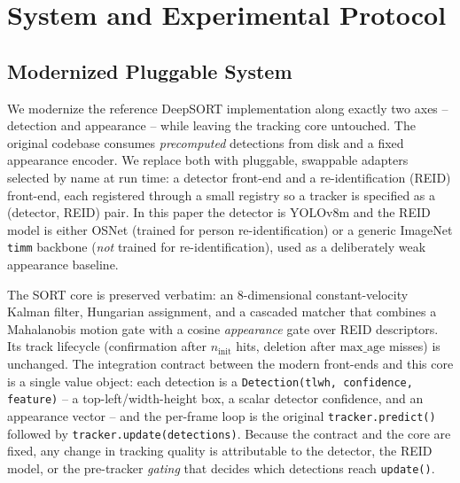 \section{System and Experimental Protocol}
\label{sec:method}

\subsection{Modernized Pluggable System}

We modernize the reference DeepSORT implementation \cite{bewley2016sort,wojke2017deepsort}
along exactly two axes -- detection and appearance -- while leaving the tracking core untouched.
The original codebase consumes \emph{precomputed} detections from disk and a fixed appearance
encoder. We replace both with pluggable, swappable adapters selected by name at run time: a
detector front-end and a re-identification (REID) front-end, each registered through a small
registry so a tracker is specified as a (detector, REID) pair. In this paper the detector is
YOLOv8m \cite{jocher2023yolov8} and the REID model is either OSNet \cite{zhou2019osnet} (trained
for person re-identification) or a generic ImageNet \texttt{timm} backbone \cite{wightman2019timm}
(\emph{not} trained for re-identification), used as a deliberately weak appearance baseline.

The SORT core is preserved verbatim: an 8-dimensional constant-velocity Kalman filter, Hungarian
assignment, and a cascaded matcher that combines a Mahalanobis motion gate with a cosine
\emph{appearance} gate over REID descriptors. Its track lifecycle (confirmation after $n_{\text{init}}$
hits, deletion after $\text{max\_age}$ misses) is unchanged. The integration contract between the
modern front-ends and this core is a single value object: each detection is a
\texttt{Detection(tlwh, confidence, feature)} -- a top-left/width-height box, a scalar detector
confidence, and an appearance vector -- and the per-frame loop is the original
\texttt{tracker.predict()} followed by \texttt{tracker.update(detections)}. Because the contract and
the core are fixed, any change in tracking quality is attributable to the detector, the REID model,
or the pre-tracker \emph{gating} that decides which detections reach \texttt{update()}.

